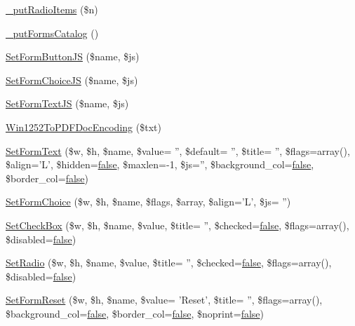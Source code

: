 \begin{DoxyCompactItemize}
\hyperlink{classform_a357ef060d248777968a2f74271369b87}{\-\_\-put\-Radio\-Items} (\$n)
\item 
\hyperlink{classform_a26254f8196a1d17aecbe712f379be57c}{\-\_\-put\-Forms\-Catalog} ()
\item 
\hyperlink{classform_af3d986b8a21036c2507e807b63b5a991}{Set\-Form\-Button\-J\-S} (\$name, \$js)
\item 
\hyperlink{classform_ab9308ade25ff520ec08aa8126960828d}{Set\-Form\-Choice\-J\-S} (\$name, \$js)
\item 
\hyperlink{classform_ae2a74c6cd5327c70b2efa76e852f8e97}{Set\-Form\-Text\-J\-S} (\$name, \$js)
\item 
\hyperlink{classform_a6ba7db996a2e17ab4e94aa5e7f9bc5eb}{Win1252\-To\-P\-D\-F\-Doc\-Encoding} (\$txt)
\item 
\hyperlink{classform_ae0cd3f57769ab0acba4c9039797019c7}{Set\-Form\-Text} (\$w, \$h, \$name, \$value= '', \$default= '', \$title= '', \$flags=array(), \$align='L', \$hidden=\hyperlink{ttfontsuni_8php_afbaa04e5cc97693dc668b3c45d3dd740}{false}, \$maxlen=-\/1, \$js='', \$background\-\_\-col=\hyperlink{ttfontsuni_8php_afbaa04e5cc97693dc668b3c45d3dd740}{false}, \$border\-\_\-col=\hyperlink{ttfontsuni_8php_afbaa04e5cc97693dc668b3c45d3dd740}{false})
\item 
\hyperlink{classform_abc0bc979b613ad12cfad46a906a37bf2}{Set\-Form\-Choice} (\$w, \$h, \$name, \$flags, \$array, \$align='L', \$js= '')
\item 
\hyperlink{classform_a06c4cfabe1eb6634ec5db8fa5c178aae}{Set\-Check\-Box} (\$w, \$h, \$name, \$value, \$title= '', \$checked=\hyperlink{ttfontsuni_8php_afbaa04e5cc97693dc668b3c45d3dd740}{false}, \$flags=array(), \$disabled=\hyperlink{ttfontsuni_8php_afbaa04e5cc97693dc668b3c45d3dd740}{false})
\item 
\hyperlink{classform_afa4f8cc40ecce44d2941e080569cf758}{Set\-Radio} (\$w, \$h, \$name, \$value, \$title= '', \$checked=\hyperlink{ttfontsuni_8php_afbaa04e5cc97693dc668b3c45d3dd740}{false}, \$flags=array(), \$disabled=\hyperlink{ttfontsuni_8php_afbaa04e5cc97693dc668b3c45d3dd740}{false})
\item 
\hyperlink{classform_ad7a9707565fac41bc88c14e98c2a41c0}{Set\-Form\-Reset} (\$w, \$h, \$name, \$value= 'Reset', \$title= '', \$flags=array(), \$background\-\_\-col=\hyperlink{ttfontsuni_8php_afbaa04e5cc97693dc668b3c45d3dd740}{false}, \$border\-\_\-col=\hyperlink{ttfontsuni_8php_afbaa04e5cc97693dc668b3c45d3dd740}{false}, \$noprint=\hyperlink{ttfontsuni_8php_afbaa04e5cc97693dc668b3c45d3dd740}{false})
\item 

\end{DoxyCompactItemize}
